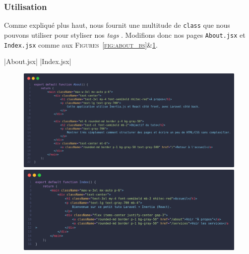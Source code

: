 \subsubsection[Utilisation]{Utilisation} \label{sec:utilisation}

Comme expliqué plus haut, \tailwind{} nous fournit une multitude de \verb|class| que nous pouvons utiliser pour styliser nos \textit{tags} \html{}. Modifions donc nos pages \verb|About.jsx| et \verb|Index.jsx| comme aux \textsc{Figures~\ref{fig:about_bs}\&\ref{fig:index_bs}}.

|About.jsx|
|Index.jsx|
\begin{figure}[!ht]
    \centering
    \begin{minipage}{0.45\textwidth}
         \centering
         \includegraphics[width=\textwidth]{figures-C1/about.jsx.png}
         \caption{\protect{}\label{fig:about_bs}}
    \end{minipage}
    \begin{minipage}{0.53\textwidth}
         \centering
         \includegraphics[width=\textwidth]{figures-C1/index.jsx.png}
         \caption{\protect{}\label{fig:index_bs}}
    \end{minipage}
\end{figure}

